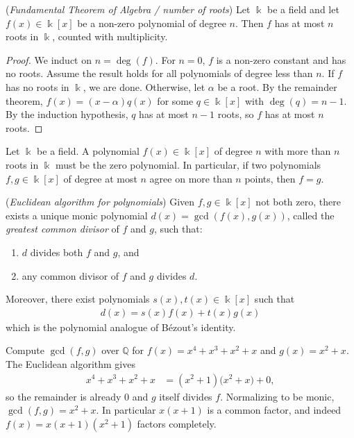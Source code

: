 \documentclass[a4paper, 12pt]{book} %
\begin{document}
\begin{theorem}
    (\emph{Fundamental Theorem of Algebra / number of roots}) Let $\Bbbk$ be a field and let $f(x) \in \Bbbk[x]$ be a non-zero polynomial of degree $n$. Then $f$ has at most $n$ roots in $\Bbbk$, counted with multiplicity.
\end{theorem}

\begin{proof}
    We induct on $n = \deg(f)$. For $n = 0$, $f$ is a non-zero constant and has no roots. Assume the result holds for all polynomials of degree less than $n$. If $f$ has no roots in $\Bbbk$, we are done. Otherwise, let $\alpha$ be a root. By the remainder theorem, $f(x) = (x - \alpha) q(x)$ for some $q \in \Bbbk[x]$ with $\deg(q) = n - 1$. By the induction hypothesis, $q$ has at most $n - 1$ roots, so $f$ has at most $n$ roots.
\end{proof}

\begin{corollary}
    Let $\Bbbk$ be a field. A polynomial $f(x) \in \Bbbk[x]$ of degree $n$ with more than $n$ roots in $\Bbbk$ must be the zero polynomial. In particular, if two polynomials $f, g \in \Bbbk[x]$ of degree at most $n$ agree on more than $n$ points, then $f = g$.
\end{corollary}

\begin{theorem}
    (\emph{Euclidean algorithm for polynomials}) Given $f, g \in \Bbbk[x]$ not both zero, there exists a unique monic polynomial $d(x) = \gcd(f(x), g(x))$, called the \emph{greatest common divisor} of $f$ and $g$, such that:
    \begin{enumerate}
        \item $d$ divides both $f$ and $g$, and
        \item any common divisor of $f$ and $g$ divides $d$.
    \end{enumerate}
    Moreover, there exist polynomials $s(x), t(x) \in \Bbbk[x]$ such that
    \begin{align}
        d(x) = s(x) f(x) + t(x) g(x)
    \end{align}
    which is the polynomial analogue of B\'ezout's identity.
\end{theorem}

\begin{example}
    Compute $\gcd(f, g)$ over $\mathbb{Q}$ for $f(x) = x^4 + x^3 + x^2 + x$ and $g(x) = x^2 + x$. The Euclidean algorithm gives
    \begin{align}
        x^4 + x^3 + x^2 + x &= (x^2 + 1)\big(x^2 + x\big) + 0,
    \end{align}
    so the remainder is already $0$ and $g$ itself divides $f$. Normalizing to be monic, $\gcd(f, g) = x^2 + x$. In particular $x(x+1)$ is a common factor, and indeed $f(x) = x(x+1)(x^2+1)$ factors completely.
\end{example}
\end{document}
